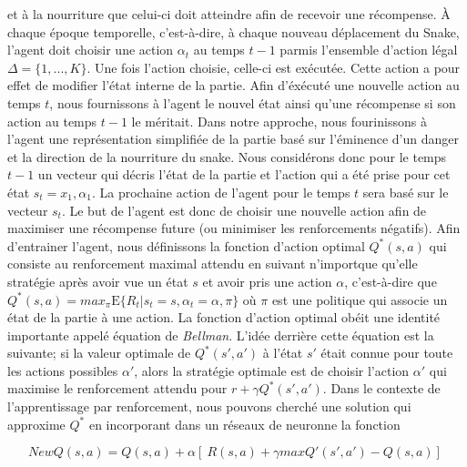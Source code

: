 \documentclass{article}
\begin{document}
et à la nourriture que celui-ci doit atteindre afin de recevoir une récompense. À chaque époque temporelle, c'est-à-dire, à chaque nouveau déplacement du Snake, l'agent doit choisir une action  $\alpha_t$ au temps $t-1$  parmis l'ensemble d'action légal $\Delta  = \{1, ..., K\}$. Une fois l'action choisie, celle-ci est exécutée. Cette action a pour effet de modifier l'état interne de la partie. Afin d'éxécuté une nouvelle action au temps $t$, nous fournissons à l'agent le nouvel état ainsi qu'une récompense si son action au temps $t-1$ le méritait. Dans notre approche, nous fourinissons à l'agent une représentation simplifiée de la partie basé sur l'éminence d'un danger et la direction de la nourriture du snake. Nous considérons donc pour le temps $t-1$ un vecteur qui décris l'état de la partie et l'action qui a été prise pour cet état $s_t = x_1, \alpha_1$. La prochaine action de l'agent pour le temps $t$ sera basé sur le vecteur $s_t$. Le but de l'agent est donc de choisir une nouvelle action afin de maximiser une récompense future (ou minimiser les renforcements négatifs). Afin d'entrainer l'agent, nous définissons la fonction d'action optimal $Q^*(s,a)$ qui consiste au renforcement maximal attendu en suivant n'importque qu'elle stratégie après avoir vue un état $s$ et avoir pris une action $\alpha$, c'est-à-dire que $Q^*(s,a)= max_\pi 	\mathrm{E} \{R_t | s_t = s, \alpha_t = \alpha, \pi\}$ où $\pi$ est une politique qui associe un état de la partie à une action.  La fonction d'action optimal obéit une identité importante appelé équation de \textit{Bellman}. L'idée derrière cette équation est la suivante; si la valeur optimale de $Q^*(s',a')$ à l'état $s'$ était connue pour toute les actions possibles $\alpha'$, alors la stratégie optimale est de choisir l'action $\alpha'$ qui maximise le renforcement attendu pour $r + \gamma Q^*(s',a')$. Dans le contexte de l'apprentissage par renforcement, nous pouvons cherché une solution qui approxime $Q^*$ en incorporant dans un réseaux de neuronne la fonction 

$$NewQ(s,a) = Q(s,a)  + \alpha [\ R(s,a) + \gamma maxQ{'} (s{'},a{'}) - Q(s,a) ]\ $$
\end{document}
